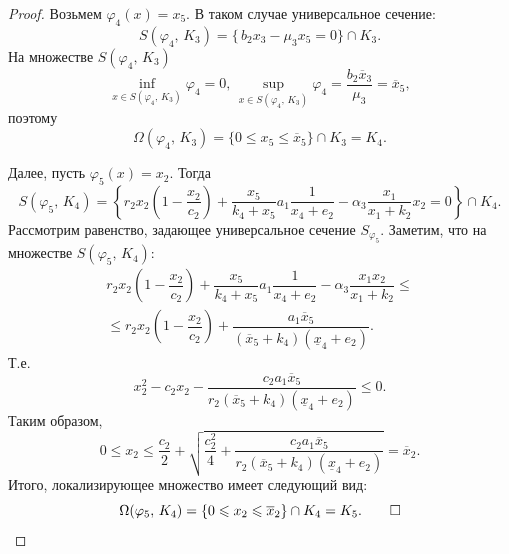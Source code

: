 \documentclass[14pt,a4paper]{extarticle}
\begin{document}
\begin{proof}
		Возьмем $\varphi_4(x)=x_5$. В таком случае универсальное сечение:
		\[S(\varphi_4,\, K_3)=\{\, b_2x_3-\mu_3x_5=0\}\cap K_3.\]
		На множестве $S(\varphi_4,\, K_3)$
		\[\inf\limits_{x\in S(\varphi_4,\, K_3)} \varphi_4=0,\, \sup\limits_{x\in S(\varphi_4,\, K_3)} \varphi_4=\dfrac{b_2\overline{x}_3}{\mu_3}=\overline{x}_5,\]
		поэтому 
		\[\Omega(\varphi_4,\, K_3) = \{0 \leqslant x_5 \leqslant \overline{x}_5\} \cap K_3 = K_4.\]
		
		Далее, пусть $\varphi_5(x)=x_2$. Тогда 
		\[S(\varphi_5,\, K_4)=\left\{r_2x_2\left(1-\dfrac{x_2}{c_2}\right)+\dfrac{x_5}{k_4+x_5}a_1\dfrac{1}{x_4+e_2}-\alpha_3\dfrac{x_1}{x_1+k_2}x_2=0\right\}\cap K_4.\]
		Рассмотрим равенство, задающее универсальное сечение $S_{\varphi_5}$. Заметим, что на множестве $S(\varphi_5,\, K_4)$:
		\begin{multline*}
			r_2x_2\left(1 - \dfrac{x_2}{c_2}\right) + \dfrac{x_5}{k_4+x_5}a_1\dfrac{1}{x_4+e_2} - \alpha_3\dfrac{x_1x_2}{x_1+k_2}\le\\
			\le r_2x_2\left(1-\dfrac{x_2}{c_2}\right) + \dfrac{a_1\overline{x}_5}{(\overline{x}_5+k_4)(\underline{x}_4+e_2)}.
		\end{multline*}
		Т.е.
		\[x_2^2-c_2x_2-\dfrac{c_2a_1\overline{x}_5}{r_2(\overline{x}_5+k_4)(\underline{x}_4+e_2)}\leqslant 0.\]
		Таким образом, 
		\[0 \leqslant x_2 \leqslant \dfrac{c_2}{2}+\sqrt{\dfrac{c_2^2}{4}+\dfrac{c_2a_1\overline{x}_5}{r_2(\overline{x}_5+k_4)(\underline{x}_4+e_2)}}=\overline{x}_2.\]
		Итого, локализирующее множество имеет следующий вид:
		\[\Omega(\varphi_5,\, K_4)=\{0\leqslant x_2 \leqslant \overline{x}_2\} \cap K_4 = K_5.\qed\]
	\end{proof}
	
\end{document}
